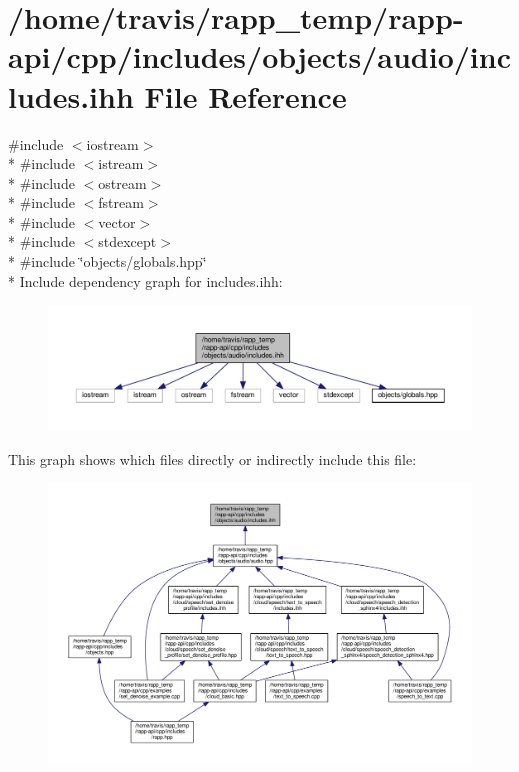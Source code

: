 \hypertarget{objects_2audio_2includes_8ihh}{\section{/home/travis/rapp\-\_\-temp/rapp-\/api/cpp/includes/objects/audio/includes.ihh File Reference}
\label{objects_2audio_2includes_8ihh}
}
{\ttfamily \#include $<$iostream$>$}\\*
{\ttfamily \#include $<$istream$>$}\\*
{\ttfamily \#include $<$ostream$>$}\\*
{\ttfamily \#include $<$fstream$>$}\\*
{\ttfamily \#include $<$vector$>$}\\*
{\ttfamily \#include $<$stdexcept$>$}\\*
{\ttfamily \#include \char`\"{}objects/globals.\-hpp\char`\"{}}\\*
Include dependency graph for includes.\-ihh\-:
\nopagebreak
\begin{figure}[H]
\begin{center}
\leavevmode
\includegraphics[width=350pt]{objects_2audio_2includes_8ihh__incl}
\end{center}
\end{figure}
This graph shows which files directly or indirectly include this file\-:
\nopagebreak
\begin{figure}[H]
\begin{center}
\leavevmode
\includegraphics[width=350pt]{objects_2audio_2includes_8ihh__dep__incl}
\end{center}
\end{figure}
